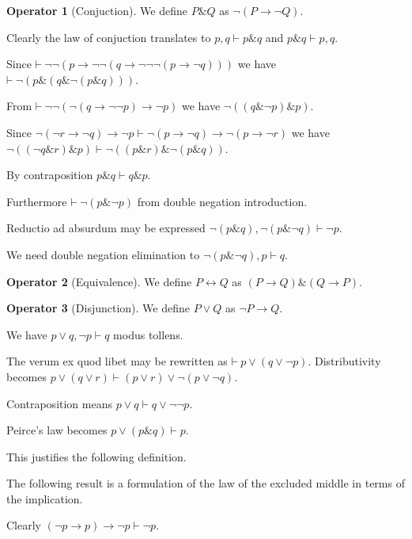 \documentclass{amsbook}
\newcommand{\infers}{\mathrel\vdash}
\newcommand{\theorem}{\mathord\vdash\medspace}
\newcommand{\then}{\mathrel\rightarrow}
\newcommand{\conj}{\mathrel\&}
\newcommand{\eqv}{\mathrel\leftrightarrow}
\newcommand{\disj}{\mathrel\vee}
\theoremstyle{definition}
\newtheorem{op}{Operator}[section]
\begin{document}
\begin{op}[Conjuction]
    We define $P \conj Q$ as $\neg(P \then \neg Q)$.
\end{op}

Clearly the law of conjuction translates to $p, q \infers p \conj q$ and $p \conj q \infers p, q$.

Since $\theorem \neg\neg(p \then \neg\neg(q \then \neg\neg\neg(p \then \neg q)))$ we have $\theorem \neg(p \conj (q \conj \neg(p \conj q)))$.

From $\theorem \neg\neg(\neg(q \then \neg\neg p) \then \neg p)$ we have $\neg((q \conj \neg p) \conj p) $.

Since $\neg(\neg r \then \neg q) \then \neg p \infers \neg(p \then \neg q) \then \neg(p \then \neg r)$ we have $\neg((\neg q \conj r) \conj p) \infers \neg((p \conj r) \conj \neg(p \conj q))$.

By contraposition $p \conj q \infers q \conj p$.

Furthermore $\theorem \neg(p \conj \neg p)$ from double negation introduction.

Reductio ad absurdum may be expressed $\neg(p \conj q), \neg(p \conj \neg q) \infers \neg p$.

We need double negation elimination to $\neg(p \conj \neg q), p \infers q$.

\begin{op}[Equivalence]
    We define $P \eqv Q$ as $(P \then Q) \conj (Q \then P)$.
\end{op}

\begin{op}[Disjunction]
    We define $P \disj Q$ as $\neg P \then Q$.
\end{op}

We have $p \disj q, \neg p \infers q$ modus tollens.

The verum ex quod libet may be rewritten as $\theorem p \disj (q \disj \neg p)$.
Distributivity becomes $p \disj (q \disj r) \infers (p \disj r) \disj \neg(p \disj \neg q)$.

Contraposition means $p \disj q \infers q \disj \neg\neg p$.

Peirce's law becomes $p \vee (p \conj q) \infers p$.


\newpage


This justifies the following definition.

The following result is a formulation of the law of the excluded middle in terms of the implication.

Clearly $(\neg p \then p) \then \neg p \infers \neg p$.
\end{document}
